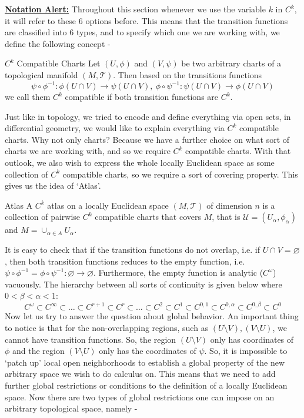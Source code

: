 \underline{\textbf{Notation Alert:}} Throughout this section whenever we use the variable $k$ in $C^k$, it will refer to these 6 options before. This means that the transition functions are classified into 6 types, and to specify which one we are working with, we define the following concept -
\begin{Definition}{$C^k$ Compatible Charts}\label{c^k_compatible_charts}
	Let $(U,\phi)$ and $(V,\psi)$ be two arbitrary charts of a topological manifold $(M,\mathcal{T})$. Then based on the transitions functions $$ \psi\circ\phi^{-1}:\phi(U\cap V)\to\psi(U\cap V),\ \phi\circ\psi^{-1}:\psi(U\cap V)\to\phi(U\cap V)$$ we call them $C^k$ compatible if both transition functions are $C^k$.
\end{Definition}
\noindent Just like in topology, we tried to encode and define everything via open sets, in differential geometry, we would like to explain everything via $C^k$ compatible charts. Why not only charts? Because we have a further choice on what sort of charts we are working with, and so we require $C^k$ compatible charts. With that outlook, we also wish to express the whole locally Euclidean space as some collection of $C^k$ compatible charts, so we require a sort of covering property. This gives us the idea of `Atlas'.
\begin{Definition}{Atlas}\label{atlas}
	A $C^k$ atlas on a locally Euclidean space $(M,\mathcal{T})$ of dimension $n$ is a collection of pairwise $C^k$ compatible charts that covers $M$, that is $\mathcal{U}=(U_{\alpha},\phi_{\alpha})$ and $M=\cup_{\alpha\in A}U_{\alpha}$.
\end{Definition}
\noindent It is easy to check that if the transition functions do not overlap, i.e. if $U\cap V=\varnothing$, then both transition functions reduces to the empty function, i.e. $\psi\circ\phi^{-1}=\phi\circ\psi^{-1}:\varnothing\to\varnothing$. Furthermore, the empty function is analytic ($C^\omega$) vacuously. The hierarchy between all sorts of continuity is given below where $0<\beta<\alpha<1$: $$\boxed{ C^\omega\subset C^\infty\subset\dots\subset C^{r+1}\subset C^r\subset\dots\subset C^2\subset C^1\subset C^{0,1}\subset C^{0,\alpha}\subset C^{0,\beta}\subset C^0}$$ Now let us try to answer the question about global behavior. An important thing to notice is that for the non-overlapping regions, such as $(U\setminus V),(V\setminus U)$, we cannot have transition functions. So, the region $(U\setminus V)$ only has coordinates of $\phi$ and the region $(V\setminus U)$ only has the coordinates of $\psi$. So, it is impossible to `patch up' local open neighborhoods to establish a global property of the new arbitrary space we wish to do calculus on. This means that we need to add further global restrictions or conditions to the definition of a locally Euclidean space. Now there are two types of global restrictions one can impose on an arbitrary topological space, namely -
